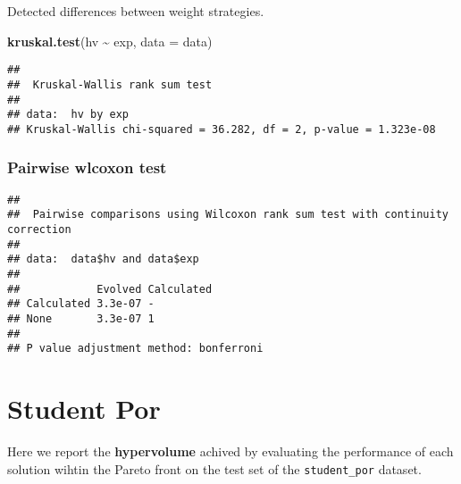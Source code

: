 \documentclass[
]{book}
\newenvironment{Shaded}{\begin{snugshade}}{\end{snugshade}}
\newcommand{\AttributeTok}[1]{\textcolor[rgb]{0.13,0.29,0.53}{#1}}
\newcommand{\ConstantTok}[1]{\textcolor[rgb]{0.56,0.35,0.01}{#1}}
\newcommand{\FunctionTok}[1]{\textcolor[rgb]{0.13,0.29,0.53}{\textbf{#1}}}
\newcommand{\NormalTok}[1]{#1}
\newcommand{\SpecialCharTok}[1]{\textcolor[rgb]{0.81,0.36,0.00}{\textbf{#1}}}
\newcommand{\StringTok}[1]{\textcolor[rgb]{0.31,0.60,0.02}{#1}}
\begin{document}
Detected differences between weight strategies.

\begin{Shaded}
\begin{Highlighting}[]
\FunctionTok{kruskal.test}\NormalTok{(hv }\SpecialCharTok{\textasciitilde{}}\NormalTok{ exp, }\AttributeTok{data =}\NormalTok{ data)}
\end{Highlighting}
\end{Shaded}

\begin{verbatim}
## 
##  Kruskal-Wallis rank sum test
## 
## data:  hv by exp
## Kruskal-Wallis chi-squared = 36.282, df = 2, p-value = 1.323e-08
\end{verbatim}

\hypertarget{pairwise-wlcoxon-test-1}{%
\subsection{Pairwise wlcoxon test}\label{pairwise-wlcoxon-test-1}}

\begin{Shaded}
\end{Shaded}

\begin{verbatim}
## 
##  Pairwise comparisons using Wilcoxon rank sum test with continuity correction 
## 
## data:  data$hv and data$exp 
## 
##            Evolved Calculated
## Calculated 3.3e-07 -         
## None       3.3e-07 1         
## 
## P value adjustment method: bonferroni
\end{verbatim}

\hypertarget{student-por}{%
\chapter{Student Por}\label{student-por}}

Here we report the \textbf{hypervolume} achived by evaluating the performance of each solution wihtin the Pareto front on the test set of the \texttt{student\_por} dataset.
\end{document}
